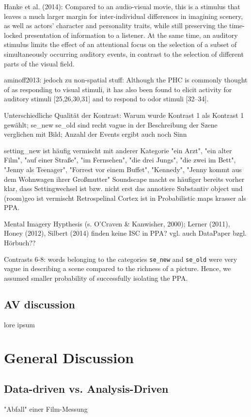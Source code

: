 \documentclass[english]{article}
\begin{document}
Hanke et al. (2014): Compared to an audio-visual movie, this is a stimulus that
leaves a much larger margin for inter-individual differences in imagining
scenery, as well as actors' character and personality traits, while still
preserving the time-locked presentation of information to a listener. At the
same time, an auditory stimulus limits the effect of an attentional focus on the
selection of a subset of simultaneously occurring auditory events, in contrast
to the selection of different parts of the visual field.

aminoff2013: jedoch zu non-spatial stuff: Although the PHC is commonly thought
of as responding to visual stimuli, it has also been found to elicit activity
for auditory stimuli [25,26,30,31] and to respond to odor stimuli [32–34].

Unterschiedliche Qualität der Kontrast: Warum wurde Kontrast 1 als Kontrast 1
gewählt; se\_new se\_old sind recht vague in der Beschreibung der Szene
verglichen mit Bild; Anzahl der Events ergibt auch noch Sinn

setting\_new ist häufig vermischt mit anderer Kategorie "ein Arzt", "ein alter
Film", "auf einer Straße", "im Fernsehen", "die drei Jungs", "die zwei im Bett",
"Jenny als Teenager", "Forrest vor einem Buffet", "Kennedy", "Jenny kommt aus
dem Wohnwagen ihrer Großmutter" Soundscape macht es häufiger bereits vorher
klar, dass Settingwechsel ist bzw. nicht erst das annotiere Substantiv object
und (room)geo ist vermischt Retrospelinal Cortex ist in Probabilistic maps
krasser als PPA.

Mental Imagery Hypthesis (s. O'Craven \& Kanwisher, 2000); Lerner (2011), Honey
(2012), Silbert (2014) finden keine ISC in PPA? vgl. auch DataPaper bzgl.
Hörbuch??

Contrasts 6-8: words belonging to the categories \texttt{se\_new} and
\texttt{se\_old} were very vague in describing a scene compared to the richness
of a picture. Hence, we assumed smaller probability of successfully isolating
the PPA.


\subsection{AV discussion}
lore ipsum

\section*{General Discussion}

\subsection{Data-driven vs. Analysis-Driven}
"Abfall" einer Film-Messung
\end{document}
